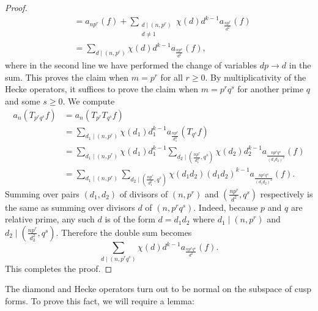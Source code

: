 \begin{proof}
\begin{align*}
        &= a_{np^{r}}(f)+\sum_{\substack{d \mid (n,p^{r}) \\ d \neq 1}}\chi(d)d^{k-1}a_{\frac{np^{r}}{d^{2}}}(f) \\
        &= \sum_{d \mid (n,p^{r})}\chi(d)d^{k-1}a_{\frac{np^{r}}{d^{2}}}(f),
      \end{align*}
      where in the second line we have performed the change of variables $dp \to d$ in the sum. This proves the claim when $m = p^{r}$ for all $r \ge 0$. By multiplicativity of the Hecke operators, it suffices to prove the claim when $m = p^{r}q^{s}$ for another prime $q$ and some $s \ge 0$. We compute
      \begin{align*}
        a_{n}(T_{p^{r}q^{s}}f) &= a_{n}(T_{p^{r}}T_{q^{s}}f) \\
        &= \sum_{d_{1} \mid (n,p^{r})}\chi(d_{1})d_{1}^{k-1}a_{\frac{np^{r}}{d_{1}^{2}}}(T_{q^{s}}f) \\
        &= \sum_{d_{1} \mid (n,p^{r})}\chi(d_{1})d_{1}^{k-1}\sum_{d_{2} \mid \left(\frac{np^{r}}{d_{1}^{2}},q^{s}\right)}\chi(d_{2})d_{2}^{k-1}a_{\frac{np^{r}q^{s}}{(d_{1}d_{2})^{2}}}(f) \\
        &= \sum_{d_{1} \mid (n,p^{r})}\sum_{d_{2} \mid \left(\frac{np^{r}}{d_{1}^{2}},q^{s}\right)}\chi(d_{1}d_{2})(d_{1}d_{2})^{k-1}a_{\frac{np^{r}q^{s}}{(d_{1}d_{2})^{2}}}(f).
      \end{align*}
      Summing over pairs $(d_{1},d_{2})$ of divisors of $(n,p^{r})$ and $\left(\frac{np^{r}}{d^{2}},q^{s}\right)$ respectively is the same as summing over divisors $d$ of $(n,p^{r}q^{s})$. Indeed, because $p$ and $q$ are relative prime, any such $d$ is of the form $d = d_{1}d_{2}$ where $d_{1} \mid (n,p^{r})$ and $d_{2} \mid \left(\frac{np^{r}}{d_{2}^{2}},q^{s}\right)$. Therefore the double sum becomes
      \[
        \sum_{d \mid (n,p^{r}q^{s})}\chi(d)d^{k-1}a_{\frac{np^{r}q^{s}}{d^{2}}}(f).
      \]
      This completes the proof.
    \end{proof}

    The diamond and Hecke operators turn out to be normal on the subspace of cusp forms. To prove this fact, we will require a lemma:

